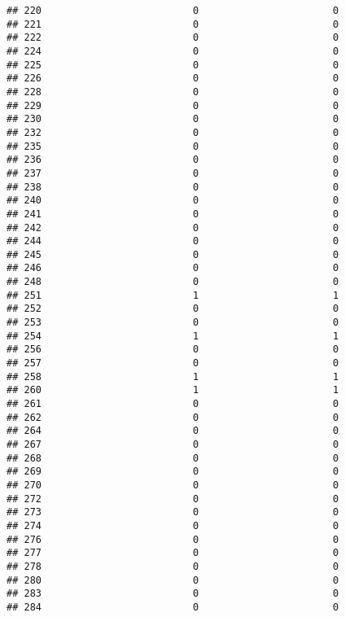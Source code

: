 \documentclass[
]{article}
\begin{document}
\begin{verbatim}
## 220                          0                       0
## 221                          0                       0
## 222                          0                       0
## 224                          0                       0
## 225                          0                       0
## 226                          0                       0
## 228                          0                       0
## 229                          0                       0
## 230                          0                       0
## 232                          0                       0
## 235                          0                       0
## 236                          0                       0
## 237                          0                       0
## 238                          0                       0
## 240                          0                       0
## 241                          0                       0
## 242                          0                       0
## 244                          0                       0
## 245                          0                       0
## 246                          0                       0
## 248                          0                       0
## 251                          1                       1
## 252                          0                       0
## 253                          0                       0
## 254                          1                       1
## 256                          0                       0
## 257                          0                       0
## 258                          1                       1
## 260                          1                       1
## 261                          0                       0
## 262                          0                       0
## 264                          0                       0
## 267                          0                       0
## 268                          0                       0
## 269                          0                       0
## 270                          0                       0
## 272                          0                       0
## 273                          0                       0
## 274                          0                       0
## 276                          0                       0
## 277                          0                       0
## 278                          0                       0
## 280                          0                       0
## 283                          0                       0
## 284                          0                       0

\end{verbatim}
\end{document}
